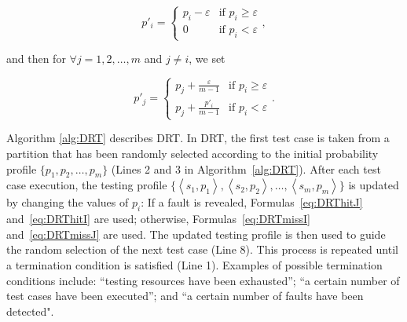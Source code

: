 \documentclass[10pt,journal,compsoc]{IEEEtran}
\begin{document}
\begin{equation}
\label{eq:DRTmissI}
p'_i =
\begin{cases}
p_i - \varepsilon & \text{if } p_i \geq \varepsilon \\
0 & \text{if } p_i < \varepsilon
\end{cases},
\end{equation}

and then for $\forall j = 1, 2, \ldots, m$ and $j \neq i$, we set

\begin{equation}
\label{eq:DRTmissJ}
p'_j =
\begin{cases}
p_j + \displaystyle\frac{\varepsilon}{m-1} & \text{if } p_i \geq \varepsilon \\
p_j + \displaystyle\frac{p'_i}{m-1} & \text{if } p_i < \varepsilon
\end{cases}.
\end{equation}

Algorithm \ref{alg:DRT} describes DRT.
In DRT, the first test case is taken from a partition that has been randomly selected according to the initial probability profile $\{p_1, p_2, \ldots, p_m\}$ (Lines 2 and 3 in Algorithm~\ref{alg:DRT}).
After each test case execution, the testing profile $\{ \left \langle s_1,p_1 \right \rangle, \left \langle s_2,p_2 \right \rangle, \ldots, \left \langle s_m,p_m \right \rangle\}$ is updated by changing the values of $p_i$:
If a fault is revealed, Formulas~\ref{eq:DRThitJ} and~\ref{eq:DRThitI} are used;
otherwise, Formulas~\ref{eq:DRTmissI} and~\ref{eq:DRTmissJ} are used.
The updated testing profile is then used to guide the random selection of the next test case (Line 8).
This process is repeated until a termination condition is satisfied (Line 1).
Examples of possible termination conditions include:
 ``testing resources have been exhausted'';
 ``a certain number of test cases have been executed''; and
 ``a certain number of faults have been detected".
\end{document}
